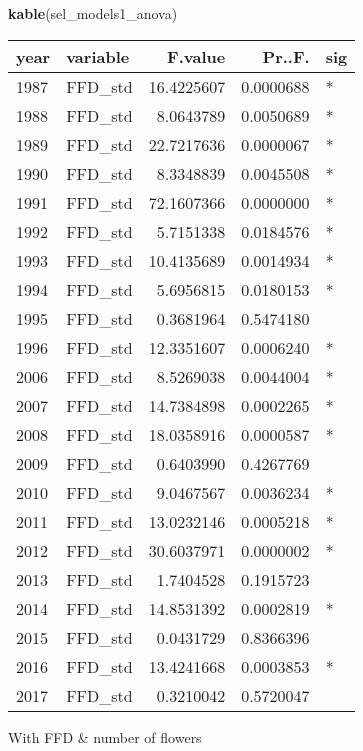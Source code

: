 \documentclass[]{article}
\newenvironment{Shaded}{\begin{snugshade}}{\end{snugshade}}
\newcommand{\KeywordTok}[1]{\textcolor[rgb]{0.13,0.29,0.53}{\textbf{#1}}}
\newcommand{\NormalTok}[1]{#1}
\begin{document}
\begin{Shaded}
\begin{Highlighting}[]
\KeywordTok{kable}\NormalTok{(sel_models1_anova)}
\end{Highlighting}
\end{Shaded}

\begin{longtable}[]{@{}llrrl@{}}
\toprule
year & variable & F.value & Pr..F. & sig\tabularnewline
\midrule
\endhead
1987 & FFD\_std & 16.4225607 & 0.0000688 & *\tabularnewline
1988 & FFD\_std & 8.0643789 & 0.0050689 & *\tabularnewline
1989 & FFD\_std & 22.7217636 & 0.0000067 & *\tabularnewline
1990 & FFD\_std & 8.3348839 & 0.0045508 & *\tabularnewline
1991 & FFD\_std & 72.1607366 & 0.0000000 & *\tabularnewline
1992 & FFD\_std & 5.7151338 & 0.0184576 & *\tabularnewline
1993 & FFD\_std & 10.4135689 & 0.0014934 & *\tabularnewline
1994 & FFD\_std & 5.6956815 & 0.0180153 & *\tabularnewline
1995 & FFD\_std & 0.3681964 & 0.5474180 &\tabularnewline
1996 & FFD\_std & 12.3351607 & 0.0006240 & *\tabularnewline
2006 & FFD\_std & 8.5269038 & 0.0044004 & *\tabularnewline
2007 & FFD\_std & 14.7384898 & 0.0002265 & *\tabularnewline
2008 & FFD\_std & 18.0358916 & 0.0000587 & *\tabularnewline
2009 & FFD\_std & 0.6403990 & 0.4267769 &\tabularnewline
2010 & FFD\_std & 9.0467567 & 0.0036234 & *\tabularnewline
2011 & FFD\_std & 13.0232146 & 0.0005218 & *\tabularnewline
2012 & FFD\_std & 30.6037971 & 0.0000002 & *\tabularnewline
2013 & FFD\_std & 1.7404528 & 0.1915723 &\tabularnewline
2014 & FFD\_std & 14.8531392 & 0.0002819 & *\tabularnewline
2015 & FFD\_std & 0.0431729 & 0.8366396 &\tabularnewline
2016 & FFD\_std & 13.4241668 & 0.0003853 & *\tabularnewline
2017 & FFD\_std & 0.3210042 & 0.5720047 &\tabularnewline
\bottomrule
\end{longtable}

With FFD \& number of flowers
\end{document}
